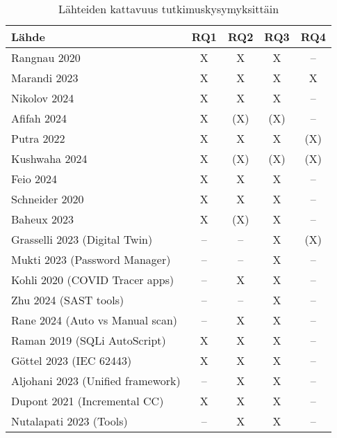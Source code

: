 \documentclass[bscthesis,finnish,oneside,biblatex]{uefcsthesis}
\begin{document}
\begin{table}[htbp]
  \centering
  \footnotesize
  \caption{Lähteiden kattavuus tutkimuskysymyksittäin}
  \label{tab:rq_matrix}
  \begin{tabular}{p{5cm}cccc}
    \toprule
    \textbf{Lähde} & \textbf{RQ1} & \textbf{RQ2} & \textbf{RQ3} & \textbf{RQ4} \\
    \midrule
    Rangnau 2020                                     & X   & X   & X   & --  \\
    Marandi 2023                                     & X   & X   & X   & X   \\
    Nikolov 2024                                     & X   & X   & X   & --  \\
    Afifah 2024                                      & X   & (X) & (X) & --  \\
    Putra 2022                                       & X   & X   & X   & (X) \\
    Kushwaha 2024                                    & X   & (X) & (X) & (X) \\
    Feio 2024                                        & X   & X   & X   & --  \\
    Schneider 2020                                   & X   & X   & X   & --  \\
    Baheux 2023                                      & X   & (X) & X   & --  \\
    Grasselli 2023 (Digital Twin)                    & --  & --  & X   & (X) \\
    Mukti 2023 (Password Manager)                    & --  & --  & X   & --  \\
    Kohli 2020 (COVID Tracer apps)                   & --  & X   & X   & --  \\
    Zhu 2024 (SAST tools)                            & --  & --  & X   & --  \\
    Rane 2024 (Auto vs Manual scan)                  & --  & X   & X   & --  \\
    Raman 2019 (SQLi AutoScript)                     & X   & X   & X   & --  \\
    Göttel 2023 (IEC 62443)                          & X   & X   & X   & --  \\
    Aljohani 2023 (Unified framework)                & --  & X   & X   & --  \\
    Dupont 2021 (Incremental CC)                     & X   & X   & X   & --  \\
    Nutalapati 2023 (Tools)                          & --  & X   & X   & --  \\

\end{tabular}
\end{table}
\end{document}
